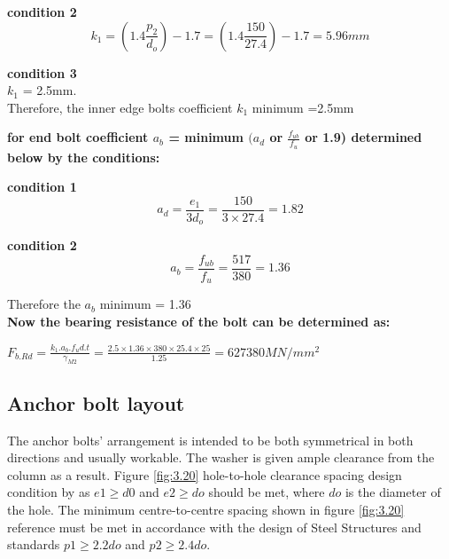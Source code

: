 {\textbf{condition 2}
\begin{equation}
 k_1 = (1.4\frac{p_2}{d_o}) - 1.7 = (1.4 \frac{150}{27.4}) - 1.7 = 5.96mm
\end{equation}

\textbf{condition 3}\\
\(k_1\) = 2.5mm.\\
Therefore, the inner edge bolts coefficient  \(k_1\) minimum =2.5mm

\textbf{for end bolt coefficient \(a_b\) = minimum \((a_{d }\) or \(\frac{f_{ub}}{f_u}\) or 1.9) determined below by the conditions: }      

\textbf{condition 1}
\begin{equation}
    a_d = \frac{e_1}{{3d}_o} =  \frac{150}{3\times27.4} = 1.82
\end{equation}
                    

\textbf{condition 2}
\begin{equation}
a_b = \frac{f_{ub}}{f_u} = \frac{517}{380} = 1.36 
\end{equation}
                                                              
Therefore the \(a_{b}\) minimum = 1.36 \\


\textbf{Now the bearing resistance of the bolt can be determined as:}

\(F_{b.Rd} = \frac{k_1.a_b.f_ud.t} {\gamma_{M2}} = \frac{2.5\times1.36\times380\times25.4\times25}{1.25} = 627380MN/mm^2\)




\subsection{Anchor bolt layout}

The anchor bolts' arrangement is intended to be both symmetrical in both directions and usually workable. The washer is given ample clearance from the column as a result.
 Figure \ref{fig:3.20} hole-to-hole clearance spacing  design condition by \cite{en19911} as \(e1 \geq d0\) and \(e2 \geq do\) should be met, where \(do\) is the diameter of the hole.
The minimum centre-to-centre spacing shown in  figure \ref{fig:3.20} reference must be met in accordance with the design of Steel Structures \cite{en19911} and \cite{weynand2012resistance} standards \(p1 \geq 2.2do\) and \(p2 \geq 2.4do\).




}
